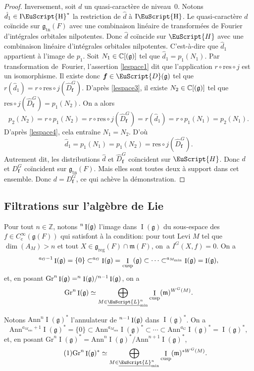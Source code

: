 \documentclass[JEP,XML,SOM,Unicode,francais]{cedram}
\let\mathcal \EuScript
\newcommand{\NoChangel}[1]{%
\expandafter\let\csname old\string#1\endcsname=#1
\let#1=\relax
\newcommand{#1}{\mathcode`l="716C\csname old\string#1\endcsname\mathcode`l="7160 }%
}
\newcommand{\frg}{\mathfrak{g}}
\newcommand{\mfrm}{\mathfrak{m}}
\newcommand{\Ann}{\mathrm{Ann}}
\newcommand{\rc}{\mathrm{c}}
\newcommand{\cusp}{\mathrm{cusp}}
\newcommand{\Fil}{\mathrm{Fil}} \NoChangel{\Fil}
\newcommand{\Gr}{\mathrm{Gr}}
\newcommand{\Nil}{\mathrm{Nil}} \NoChangel{\Nil}
\newcommand{\reg}{\mathrm{reg}}
\newcommand{\res}{\mathrm{res}}
\newcommand{\tn}{\mathrm{tn}}
\DeclareMathOperator{\rI}{I}
\DeclareMathOperator{\rIH}{I\cH}
\newcommand{\bmf}{\boldsymbol{f}}
\newcommand{\cD}{\mathcal{D}}
\newcommand{\cH}{\mathcal{H}}
\newcommand{\cL}{\mathcal{L}}
\newcommand{\CC}{\mathbb{C}}
\newcommand{\ZZ}{\mathbb{Z}}
\theoremstyle{plain}
\theoremstyle{definition}
\begin{document}
\begin{proof}
Inversement, soit $d$ un quasi-caractère de niveau~$0$. Notons $\hat{d}_{1}\in \rIH^*$ la restriction de $\hat{d}$ à $\rIH$. Le quasi-caractère $d$ coïncide sur $\frg_{\tn}(F)$ avec une combinaison linéaire de transformées de Fourier d'intégrales orbitales nilpotentes. Donc $\hat{d}$ coïncide sur $\cH$ avec une combinaison linéaire d'intégrales orbitales nilpotentes. C'est-à-dire que $\hat{d}_{1}$ appartient à l'image de $p_{1}$. Soit $N_{1}\in \CC[\Nil(\frg)]$ tel que $\hat{d}_{1}=p_{1}(N_{1})$. Par transformation de~Fourier, l'assertion \eqref{lespace1} dit que l'application $r\circ \res\circ j$ est un isomorphisme. Il existe donc $\bmf\in \cD(\frg)$ tel que $r(\hat{d}_{1})=r\circ \res\circ j(\hat{D}^G_{\bmf})$. D'après \eqref{lespace3}, il existe $N_{2}\in \CC[\Nil(\frg)]$ tel que $\res\circ j(\hat{D}^G_{\bmf})=p_{1}(N_{2})$. On a alors
\[
p_{2}(N_{2})=r\circ p_{1}(N_{2})=r\circ \res\circ j(\hat{D}^G_{\bmf})=r(\hat{d}_{1})=r\circ p_{1}(N_{1})=p_{2}(N_{1}).
\]
D'après \eqref{lespace4}, cela entraîne $N_{1}=N_{2}$. D'où
\[
\hat{d}_{1}=p_{1}(N_{1})=p_{1}(N_{2})=\res\circ j(\hat{D}^G_{\bmf}).
\]
Autrement dit, les distributions $\hat{d}$ et $\hat{D}^G_{\bmf}$ coïncident sur $\cH$. Donc $d$ et $D^G_{\bmf}$ coïncident sur $\frg_{\tn}(F)$. Mais elles sont toutes deux à support dans cet ensemble. Donc $d=D^G_{\bmf}$, ce qui achève la démonstration.
\end{proof}

\subsection{Filtrations sur l'algèbre de Lie}\label{filtrationssurlalgebredelie}
Pour tout $n \in \ZZ$, notons $\Fil^n\rI(\frg)$ l'image dans $\rI(\frg)$ du sous-espace des $f\in C_{\rc}^{\infty}(\frg(F))$ qui satisfont à la condition: pour tout Levi $M$ tel que $\dim(A_{M})>n$ et tout $X\in \frg_{\reg}(F)\cap \mfrm(F)$, on~a $I^G(X,f)=0$. On a
\[
\Fil^{a_{G}-1}\rI(\frg)=\{0\}\subset \Fil^{a_{G}}\rI(\frg)=\rI_{\cusp}(\frg)\subset\cdots\subset \Fil^{a_{M_{\min}}}\rI(\frg)=\rI(\frg),
\]
et, en posant $\Gr^n\rI(\frg)=\Fil^n\rI(\frg)/\Fil^{n-1}\rI(\frg)$, on a
\[
\Gr^n\rI(\frg)\simeq \bigoplus_{M\in \underline{\cL}_{\min}^n}\rI_{\cusp}(\mfrm)^{W^G(M)}.
\]

Notons $\Ann^n\rI(\frg)^*$ l'annulateur de $\Fil^{n-1}\rI(\frg)$ dans $\rI(\frg)^*$. On a
\[
\Ann^{a_{M_{\min}}+1}\rI(\frg)^*=\{0\}\subset \Ann^{a_{M_{\min}}}\rI(\frg)^*\subset\cdots\subset \Ann^{a_{G}}\rI(\frg)^*=\rI(\frg)^*,
\]
et, en posant $\Gr^n\rI(\frg)^*=\Ann^n\rI(\frg)^*/\Ann^{n+1}\rI(\frg)^*$,
\begin{equation}\tag{1}\label{filtrationssurlalgebredelie1}
\Gr^n\rI(\frg)^*\simeq \bigoplus_{M\in \underline{\cL}_{\min}^n}\rI_{\cusp}(\mfrm)^{*W^G(M)}.
\end{equation}
\end{document}
